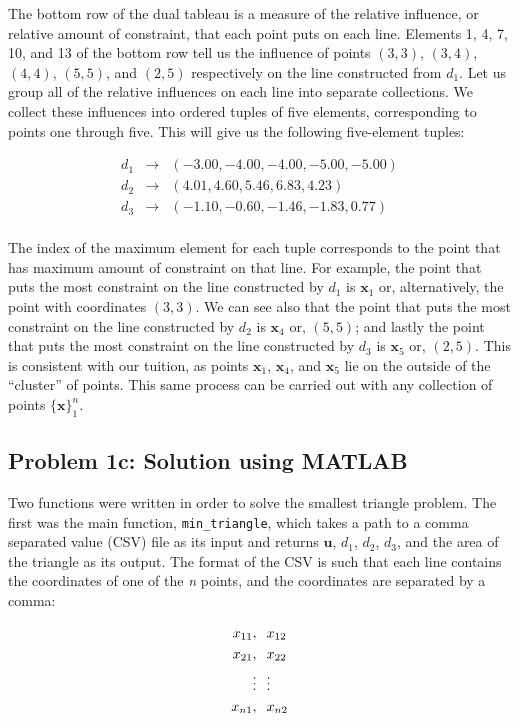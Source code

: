 \documentclass{article}
\begin{document}
The bottom row of the dual tableau is a measure of the relative influence, or relative amount of constraint, that each point puts on each line.
Elements 1, 4, 7, 10, and 13 of the bottom row tell us the influence of points $(3,3)$, $(3,4)$, $(4,4)$, $(5,5)$, and $(2,5)$ respectively on the line constructed from $d_1$.
Let us group all of the relative influences on each line into separate collections.
We collect these influences into ordered tuples of five elements, corresponding to points one through five.
This will give us the following five-element tuples:

\begin{eqnarray*}
d_1 & \rightarrow & (-3.00, -4.00, -4.00, -5.00, -5.00)\\
d_2 & \rightarrow & (4.01, 4.60, 5.46, 6.83, 4.23)\\
d_3 & \rightarrow & (-1.10, -0.60, -1.46, -1.83, 0.77)\\
\end{eqnarray*}

The index of the maximum element for each tuple corresponds to the point that has maximum amount of constraint on that line.
For example, the point that puts the most constraint on the line constructed by $d_1$ is $\mathbf{x}_1$ or, alternatively, the point with coordinates $(3,3)$.
We can see also that the point that puts the most constraint on the line constructed by $d_2$ is $\mathbf{x}_4$ or, $(5,5)$; and lastly the point that puts the most constraint on the line constructed by $d_3$ is $\mathbf{x}_5$ or, $(2,5)$.
This is consistent with our tuition, as points $\mathbf{x}_1$, $\mathbf{x}_4$, and $\mathbf{x}_5$ lie on the outside of the ``cluster'' of points.
This same process can be carried out with any collection of points $\{\mathbf{x}\}^n_1$.

\subsection{Problem 1c: Solution using MATLAB}

Two functions were written in order to solve the smallest triangle problem.
The first was the main function, \texttt{min\_triangle}, which takes a path to a comma separated value (CSV) file as its input and returns $\mathbf{u}$, $d_1$, $d_2$, $d_3$, and the area of the triangle as its output.
The format of the CSV is such that each line contains the coordinates of one of the \textit{n} points, and the coordinates are separated by a comma:

\begin{align*}
x_{11}, & \hspace{0.1in} x_{12}\\
x_{21}, & \hspace{0.1in} x_{22}\\
\vdots & \hspace{0.1in} \vdots\\
x_{n1}, & \hspace{0.1in} x_{n2}
\end{align*}
\end{document}
